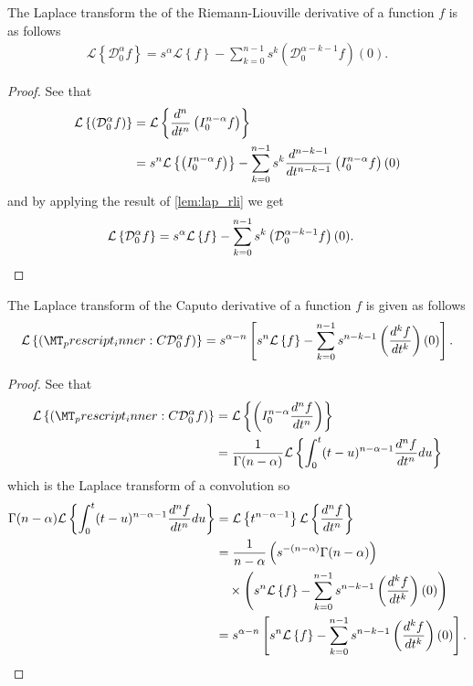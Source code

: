 \documentclass{unswmaths}
\begin{document}
\begin{lemma}
\label{lem:lap_rld}
	The Laplace transform the of the Riemann-Liouville derivative of a function $ f $ is as follows
	\begin{align*}
		\mathcal{L} \left\{\mathcal{D}_0^\alpha f\right\} = s^\alpha \mathcal{L} \left\{ f \right\} - \sum_{k=0}^{n-1} s^{k} \left( \mathcal{D}_0^{\alpha-k-1} f\right)(0).
	\end{align*}
\end{lemma}
\begin{proof}
	See that
	\begin{align*}
		\mathcal{L} \left\{  \left( \mathcal{D}_{0}^{\alpha} f \right)  \right\} &= \mathcal{L} \left\{  \frac{d^{n}}{dt^{n}} \left( I_{0}^{n-\alpha} f \right)  \right\} \\
			&= s^n\mathcal{L} \left\{ \left( I_{0}^{n-\alpha} f \right) \right\} - \sum_{k=0}^{n-1} s^k \frac{d^{n-k-1}}{dt^{n-k-1}} \left( I_{0}^{n-\alpha} f \right)(0)
	\end{align*}
	and by applying the result of \ref{lem:lap_rli} we get
	\begin{align*}
			\mathcal{L} \left\{\mathcal{D}_0^\alpha f\right\} &= s^\alpha \mathcal{L} \left\{ f \right\} - \sum_{k=0}^{n-1} s^{k} \left( \mathcal{D}_{0}^{\alpha - k - 1} f \right)(0). 
	\end{align*}
\end{proof}

\begin{lemma}
\label{lem:lap_cap}
	The Laplace transform of the Caputo derivative of  a function $ f $ is given as follows
	\begin{align*}
		\laplace{\capder{0}{\alpha}{f}} = s^{\alpha - n} \left[ s^n \laplace{f} - \sum_{k=0}^{n-1} s^{n-k-1} \left( \der{f}{t}{k} \right)(0) \right].
	\end{align*}
\end{lemma}
\begin{proof}
	See that
	\begin{align*}
		\laplace{\capder{0}{\alpha}{f}} &= \laplace{  \rli{0}{n-\alpha}{\der{f}{t}{n}}} \\
			&= \frac{1}{\Gamma(n-\alpha)}\laplace{ \int_0^t (t-u)^{n-\alpha-1} \der{f}{t}{n} du} \\ 
	\end{align*}
	which is the Laplace transform of a convolution so
	\begin{align*}
		\Gamma(n-\alpha)\mathcal{L} \left\{  \int_0^t (t-u)^{n-\alpha-1} \frac{d^{n}f}{dt^{n}} du \right\} &= \mathcal{L} \left\{ t^{n-\alpha-1} \right\} \mathcal{L} \left\{ \frac{d^{n}f}{dt^{n}} \right\} \\
		&= \frac{1}{n-\alpha} \left( s^{-(n-\alpha)} \Gamma(n-\alpha) \right) \\
		& \ \ \ \times \left( s^n \mathcal{L} \left\{ f \right\} - \sum_{k=0}^{n-1} s^{n-k-1} \left( \frac{d^{k}f}{dt^{k}} \right)(0) \right) \\
		&= s^{\alpha - n} \left[ s^n \mathcal{L} \left\{ f \right\} - \sum_{k=0}^{n-1} s^{n-k-1} \left( \frac{d^{k}f}{dt^{k}} \right)(0) \right].
	\end{align*}	
\end{proof}
\end{document}
